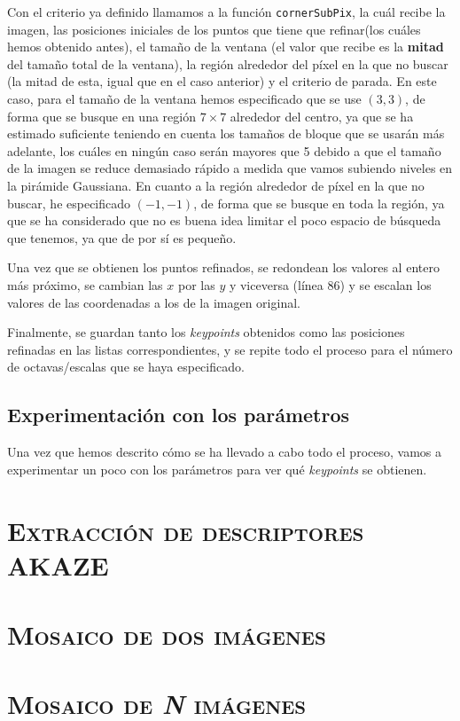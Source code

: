 \documentclass[11pt,a4paper]{article}
\begin{document}
Con el criterio ya definido llamamos a la función \texttt{cornerSubPix},
la cuál recibe la imagen, las posiciones iniciales de los puntos que tiene que
refinar(los cuáles hemos obtenido antes), el tamaño de la ventana (el
valor que recibe es la \textbf{mitad} del tamaño total de la ventana), la región
alrededor del píxel en la que no buscar (la mitad de esta, igual que en el caso
anterior) y el criterio de parada. En este caso, para el tamaño de la ventana hemos
especificado que se use $(3,3)$, de forma que se busque en una región $7 \times 7$
alrededor del centro, ya que se ha estimado suficiente teniendo en cuenta los tamaños
de bloque que se usarán más adelante, los cuáles en ningún caso serán mayores que 5
debido a que el tamaño de la imagen se reduce demasiado rápido a medida que vamos
subiendo niveles en la pirámide Gaussiana. En cuanto a la región alrededor de píxel
en la que no buscar, he especificado $(-1,-1)$, de forma que se busque en toda la región,
ya que se ha considerado que no es buena idea limitar el poco espacio de búsqueda que
tenemos, ya que de por sí es pequeño.

Una vez que se obtienen los puntos refinados, se redondean los valores al entero más
próximo, se cambian las $x$ por las $y$ y viceversa (línea 86) y se escalan los valores
de las coordenadas a los de la imagen original.

Finalmente, se guardan tanto los \textit{keypoints} obtenidos como las posiciones
refinadas en las listas correspondientes, y se repite todo el proceso para el número
de octavas/escalas que se haya especificado.

\subsection{Experimentación con los parámetros}

Una vez que hemos descrito cómo se ha llevado a cabo todo el proceso, vamos
a experimentar un poco con los parámetros para ver qué \textit{keypoints} se
obtienen.

\section{\textsc{Extracción de descriptores AKAZE}}

\section{\textsc{Mosaico de dos imágenes}}

\section{\textsc{Mosaico de \textit{N} imágenes}}

\newpage



\end{document}
